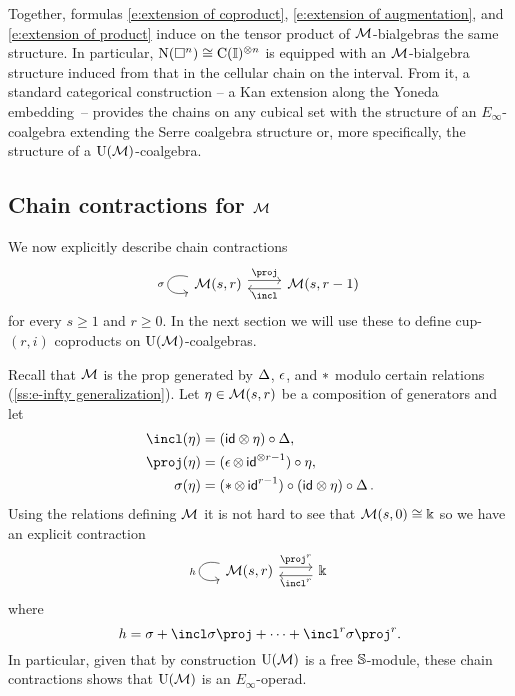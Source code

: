 Together, formulas \eqref{e:extension of coproduct}, \eqref{e:extension of augmentation}, and \eqref{e:extension of product} induce on the tensor product of $\mathcal{M}$-bialgebras the same structure.
In particular, $\operatorname{N}(\square^n) \cong \operatorname{C}(\mathbb{I})^{\otimes n}$ is equipped with an $\mathcal{M}$-bialgebra structure induced from that in the cellular chain on the interval.
From it, a standard categorical construction -- a Kan extension along the Yoneda embedding~-- provides the chains on any cubical set with the structure of an $E_\infty$-coalgebra extending the Serre coalgebra structure or, more specifically, the structure of a ${\operatorname{U}(\mathcal{M})}$-coalgebra.

\subsection{Chain contractions for $\mathcal{M}$} \label{ss:homology of M}

We now explicitly describe chain contractions
\[
\begin{tikzcd}
\arrow[loop, distance=2em, in=195, out=165, "\sigma"'] \M(s,r) \arrow[r, shift left=3pt, "\proj"] &
\M(s,r-1) \arrow[l, shift left=3pt, "\incl"]
\end{tikzcd}
\]
for every $s \geq 1$ and $r \geq 0$.
In the next section we will use these to define cup-$(r, i)$ coproducts on ${\operatorname{U}(\mathcal{M})}$-coalgebras.

Recall that $\mathcal{M}$ is the prop generated by $\operatorname{\Delta}$, $\operatorname{\epsilon}$, and $\operatorname{\ast}$ modulo certain relations (\cref{ss:e-infty generalization}).
Let $\eta \in \mathcal{M}(s,r)$ be a composition of generators and let
\begin{align*}
\incl(\eta) & = (\id \ot \eta) \circ \copr, \\
\proj(\eta) & = (\aug \ot \, \id^{\ot r-1}) \circ \eta, \\
\sigma(\eta) & = (\pr \ot \, \id^{r-1}) \circ (\id \otimes \eta) \circ \copr.
\end{align*}
Using the relations defining $\mathcal{M}$ it is not hard to see that $\mathcal{M}(s,0) \cong \Bbbk$ so we have an explicit contraction
\[
\begin{tikzcd}
\arrow[loop, distance=2em, in=195, out=165, "h"'] \M(s,r) \arrow[r, shift left=3pt, "\proj^r"] &
\k \arrow[l, shift left=3pt, "\incl^r"]
\end{tikzcd}
\]
where
\begin{equation} \label{e:big chain contraction}
h = \sigma + \incl \sigma \proj + \dots + \incl^{r} \sigma \proj^{r}.
\end{equation}
In particular, given that by construction ${\operatorname{U}(\mathcal{M})}$ is a free $\mathbb{S}$-module, these chain contractions shows that ${\operatorname{U}(\mathcal{M})}$ is an $E_\infty$-operad.

